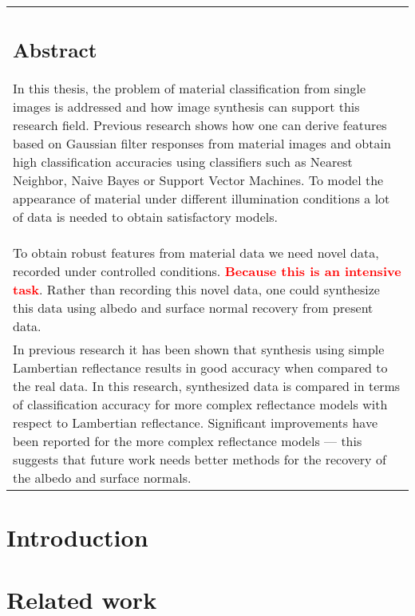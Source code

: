 \documentclass[11pt, a4paper,oneside]{book}
\newcommand{\todo}[1]{\textcolor{red}{\textbf{#1}}}
\begin{document}
	\thispagestyle{empty}
	\begin{center}
		\begin{tabular}{p{10cm}}
			\section*{Abstract}
			In this thesis, the problem of material classification from single images is addressed and how image synthesis can support this research field. Previous research shows how one can derive features based on Gaussian filter responses from material images and obtain high classification accuracies using classifiers such as Nearest Neighbor, Naive Bayes or Support Vector Machines. To model the appearance of material under different illumination conditions a lot of data is needed to obtain satisfactory models. \\[10px]

To obtain robust features from material data we need novel data, recorded under controlled conditions. \todo{Because this is an intensive task}. Rather than recording this novel data, one could synthesize this data using albedo and surface normal recovery from present data. \\[10px]

In previous research it has been shown that synthesis using simple Lambertian reflectance results in good accuracy when compared to the real data. In this research, synthesized data is compared in terms of classification accuracy for more complex reflectance models with respect to Lambertian reflectance. Significant improvements have been reported for the more complex reflectance models --- this suggests that future work needs better methods for the recovery of the albedo and surface normals.
		\end{tabular}
	\end{center}

	\newpage
	\tableofcontents
	\newpage
	\hypersetup{pageanchor=true}
	\chapter{Introduction}
	
	\chapter{Related work}
	
\end{document}
